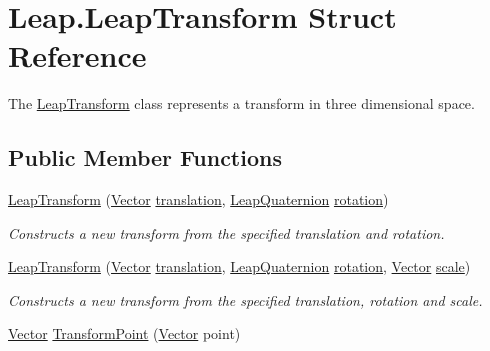 \hypertarget{struct_leap_1_1_leap_transform}{}\section{Leap.\+Leap\+Transform Struct Reference}
\label{struct_leap_1_1_leap_transform}


The \mbox{\hyperlink{struct_leap_1_1_leap_transform}{Leap\+Transform}} class represents a transform in three dimensional space.  


\subsection*{Public Member Functions}
\begin{DoxyCompactItemize}
\item 
\mbox{\hyperlink{struct_leap_1_1_leap_transform_a202169e88920074c2ca30144a4de20df}{Leap\+Transform}} (\mbox{\hyperlink{struct_leap_1_1_vector}{Vector}} \mbox{\hyperlink{struct_leap_1_1_leap_transform_ac7de7c75b3f77718715055990131f08b}{translation}}, \mbox{\hyperlink{struct_leap_1_1_leap_quaternion}{Leap\+Quaternion}} \mbox{\hyperlink{struct_leap_1_1_leap_transform_a69917840386ec2421d3886be4ec7833a}{rotation}})
\begin{DoxyCompactList}\small\item\em Constructs a new transform from the specified translation and rotation. \end{DoxyCompactList}\item 
\mbox{\hyperlink{struct_leap_1_1_leap_transform_a9cb17381736fafcf776c1f5e8b154009}{Leap\+Transform}} (\mbox{\hyperlink{struct_leap_1_1_vector}{Vector}} \mbox{\hyperlink{struct_leap_1_1_leap_transform_ac7de7c75b3f77718715055990131f08b}{translation}}, \mbox{\hyperlink{struct_leap_1_1_leap_quaternion}{Leap\+Quaternion}} \mbox{\hyperlink{struct_leap_1_1_leap_transform_a69917840386ec2421d3886be4ec7833a}{rotation}}, \mbox{\hyperlink{struct_leap_1_1_vector}{Vector}} \mbox{\hyperlink{struct_leap_1_1_leap_transform_ac8b265b9dfa089183c263bbe7ff0e42d}{scale}})
\begin{DoxyCompactList}\small\item\em Constructs a new transform from the specified translation, rotation and scale. \end{DoxyCompactList}\item 
\mbox{\hyperlink{struct_leap_1_1_vector}{Vector}} \mbox{\hyperlink{struct_leap_1_1_leap_transform_a069ce8e414f0def9697b7816dcc4a799}{Transform\+Point}} (\mbox{\hyperlink{struct_leap_1_1_vector}{Vector}} point)

\end{DoxyCompactItemize}
